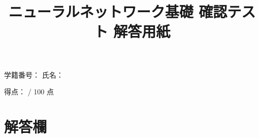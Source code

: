 \documentclass[uplatex,a4paper,12pt]{jsarticle}
\begin{document}
\title{ニューラルネットワーク基礎 確認テスト 解答用紙}
\author{}
\date{}
\maketitle

\noindent
学籍番号：\underline{\hspace{5cm}} \hfill
氏名：\underline{\hspace{5cm}}

\vspace{5mm}

\noindent
得点：\underline{\hspace{3cm}} / 100 点

\vspace{8mm}

\section*{解答欄}
\end{document}
